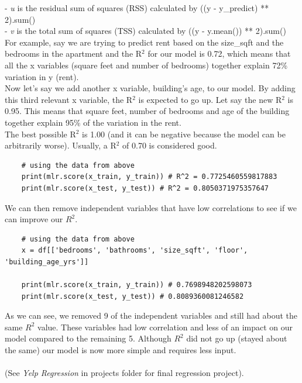 \documentclass[11pt, a4paper]{article}
\begin{document}
\begin{spacing}{1.1}
	\hspace*{2mm} - \textit{u} is the residual sum of squares (RSS) calculated by ((y - y\_predict) ** 2).sum() \\
	\hspace*{2mm} - \textit{v} is the total sum of squares (TSS) calculated by ((y - y.mean()) ** 2).sum() \vspace*{2mm} \\
	For example, say we are trying to predict rent based on the size\_sqft and the bedrooms in the apartment and the R$^2$ for our model is 0.72, which means that all the x variables (square feet and number of bedrooms) together explain 72\% variation in y (rent). \vspace*{1mm} \\	
	Now let’s say we add another x variable, building’s age, to our model. By adding this third relevant x variable, the R$^2$ is expected to go up. Let say the new R$^2$ is 0.95. This means that square feet, number of bedrooms and age of the building together explain 95\% of the variation in the rent. \vspace*{1mm} \\	
	The best possible R$^2$ is 1.00 (and it can be negative because the model can be arbitrarily worse). Usually, a R$^2$ of 0.70 is considered good.
	\begin{lstlisting}
	# using the data from above
	print(mlr.score(x_train, y_train)) # R^2 = 0.7725460559817883
	print(mlr.score(x_test, y_test)) # R^2 = 0.8050371975357647 \end{lstlisting}\vspace*{1mm}
	We can then remove independent variables that have low correlations to see if we can improve our $R^2$.
	\begin{lstlisting}
	# using the data from above
	x = df[['bedrooms', 'bathrooms', 'size_sqft', 'floor', 'building_age_yrs']]
	
	print(mlr.score(x_train, y_train)) # 0.7698948202598073
	print(mlr.score(x_test, y_test)) # 0.8089360081246582 \end{lstlisting}\vspace*{1mm}
	As we can see, we removed 9 of the independent variables and still had about the same $R^2$ value. These variables had low correlation and less of an impact on our model compared to the remaining 5. Although $R^2$ did not go up (stayed about the same) our model is now more simple and requires less input. \\~\\
	(See \textit{Yelp Regression} in projects folder for final regression project). \newpage
	

\end{spacing}
\end{document}
